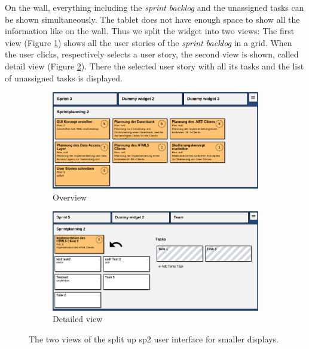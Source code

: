 \documentclass{sigchi}
\begin{document}
On the wall, everything including the \textit{sprint backlog} and the unassigned tasks can be shown simultaneously.
The tablet does not have enough space to show all the information like on the wall.
Thus we split the widget into two views:
The first view (Figure \ref{fig:sp2-overview}) shows all the user stories of the \textit{sprint backlog} in a grid.
When the user clicks, respectively selects a user story, the second view is shown, called detail view (Figure \ref{fig:sp2-detail}).
There the selected user story with all its tasks and the list of unassigned tasks is displayed.


\begin{figure}
	\centering
	\begin{subfigure}[b]{1\columnwidth}
		\includegraphics[width=\textwidth]{figures/sp2-overview}
		\caption{Overview}
		\label{fig:sp2-overview}
	\end{subfigure}%
	\quad
	\begin{subfigure}[b]{1\columnwidth}
		\includegraphics[width=\textwidth]{figures/sp2-detail}
		\caption{Detailed view}
		\label{fig:sp2-detail}
	\end{subfigure}
	
	\caption{The two views of the split up \gls{sp2} user interface for smaller displays.}\label{fig:sp2-smallscreen-views}
\end{figure}
\end{document}
